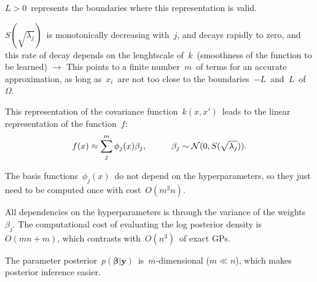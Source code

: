 \documentclass[portrait,a1,final]{a0poster} %
\let\tempone\itemize
\let\temptwo\enditemize
\renewenvironment{itemize}{\tempone\addtolength{\itemsep}{-0.3\baselineskip}}{\temptwo}
\begin{document}
\begin{minipage}{1\linewidth}
\begin{minipage}[t]{0.48\linewidth}
\begin{itemize}
\item $L > 0$\, represents the {\color{navyblue} boundaries} where this representation is valid.

\item $S(\sqrt{\lambda_j})$\, is monotonically decreasing with\, $j$, and decays rapidly to zero, and this rate of decay depends on the lenghtscale of\, $k$\, (smoothness of the function to be learned) \; $\rightarrow$ \; This points to {\color{navyblue} a finite number}\, $m$\, {\color{navyblue} of terms for an accurate approximation}, as long as\, $x_i$\, are not too close to the boundaries\, $-L$\, and\, $L$\, of\, $\Omega$.

\item This representation of the covariance function\, $k(x,x')$\, leads to the {\color{navyblue} linear representation} of the function\, $f$:
%
\begin{align*}
f(x) \approx \sum_{j}^m \phi_j(x) \beta_j, \hspace{10mm} \beta_j \sim \mathcal{N}(0,S(\sqrt{\lambda_j})).
\end{align*}
\end{itemize}

\vspace{-0.5cm}
\begin{tcolorbox}[colframe=blue!20, colback=white, title=\scriptsize Properties of the HSGP method, colbacktitle=lightblue, coltitle=black, boxrule=0.5pt]
\begin{itemize}\setlength\itemsep{2mm}
\item[+] The basis functions\, $\phi_j(x)$\, do not depend on the hyperparameters, so they just need to be computed once with cost\, $O(m^2n)$.

\item[+]  All dependencies on the hyperparameters is through the variance of the weights\, $\beta_j$. The computational cost of evaluating the log posterior density is\, $O(mn+m)$, which contrasts with\, $O(n^3)$\, of exact GPs.


\item[+] The parameter posterior\, $p(\bm{\beta}|\bm{y})$\, is\, $m$-dimensional ($m\ll n$), which makes posterior inference easier.


\end{itemize}
\end{tcolorbox}
\end{minipage}
\end{minipage}
\end{document}
